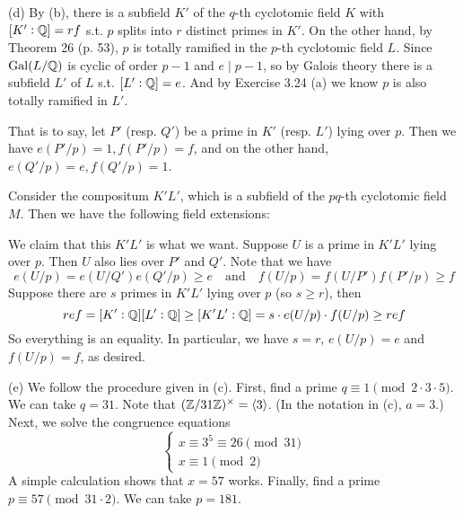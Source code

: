 \documentclass[../Marcus.tex]{subfiles}
\begin{document}
(d) By (b), there is a subfield $K'$ of the $q$-th cyclotomic field $K$ with $[K':\mathbb{Q}] = rf$ s.t. $p$ splits into $r$ distinct primes in $K'$. On the other hand, by Theorem 26 (p. 53), $p$ is totally ramified in the $p$-th cyclotomic field $L$. Since $\operatorname{Gal}(L/\mathbb{Q})$ is cyclic of order $p-1$ and $e \mid p-1$, so by Galois theory there is a subfield $L'$ of $L$ s.t. $[L':\mathbb{Q}]=e$. And by Exercise 3.24 (a) we know $p$ is also totally ramified in $L'$.

That is to say, let $P'$ (resp. $Q'$) be a prime in $K'$ (resp. $L'$) lying over $p$. Then we have $e(P'/p) = 1, f(P'/p) = f$, and on the other hand, $e(Q'/p) = e, f(Q'/p) = 1$.

Consider the compositum $K'L'$, which is a subfield of the $pq$-th cyclotomic field $M$. Then we have the following field extensions:
\begin{center}
\end{center}
We claim that this $K'L'$ is what we want. Suppose $U$ is a prime in $K'L'$ lying over $p$. Then $U$ also lies over $P'$ and $Q'$. Note that we have
$$
e(U/p) = e(U/Q')e(Q'/p) \geq e \quad \text{and} \quad f(U/p) = f(U/P')f(P'/p) \geq f
$$
Suppose there are $s$ primes in $K'L'$ lying over $p$ (so $s\geq r$), then
$$
ref = [K' : \mathbb{Q}][L' : \mathbb{Q}] \geq [K'L' : \mathbb{Q}] = s \cdot e(U/p) \cdot f(U/p) \geq ref
$$
So everything is an equality. In particular, we have $s=r$, $e(U/p) = e$ and $f(U/p) = f$, as desired.

(e) We follow the procedure given in (c). First, find a prime $q \equiv 1 \pmod{2\cdot3\cdot5}$. We can take $q=31$. Note that $(\mathbb{Z}/31\mathbb{Z})^\times = \langle3\rangle$. (In the notation in (c), $a=3$.) Next, we solve the congruence equations
$$
\begin{cases}
x \equiv 3^5 \equiv 26 \pmod{31} \\
x \equiv 1 \pmod{2}
\end{cases}
$$
A simple calculation shows that $x=57$ works. Finally, find a prime $p \equiv 57 \pmod{31\cdot2}$. We can take $p=181$.
\end{document}
